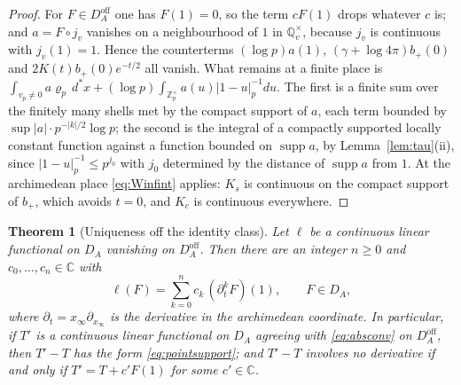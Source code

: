 \documentclass[11pt]{amsart}
\newtheorem{theorem}{Theorem}[section]
\theoremstyle{definition}
\theoremstyle{remark}
\newcommand{\C}{\mathbb C}
\newcommand{\Z}{\mathbb Z}
\newcommand{\Q}{\mathbb Q}
\newcommand{\dstar}{\,d^{*}}
\newcommand{\supp}{\operatorname{supp}}
\newcommand{\DA}{D_A}
\begin{document}
\begin{proof}
For $F\in\DA^{\mathrm{off}}$ one has $F(1)=0$, so the term $cF(1)$ drops
whatever $c$ is; and $a=F\circ j_v$ vanishes on a neighbourhood of $1$ in
$\Q_v^{\times}$, because $j_v$ is continuous with $j_v(1)=1$.  Hence the
counterterms $(\log p)a(1)$, $(\gamma+\log4\pi)b_{+}(0)$ and
$2K(t)b_{+}(0)e^{-t/2}$ all vanish.  What remains at a finite place is
$\int_{v_p\ne0}a\varrho_p\dstar x+(\log p)\int_{\Z_p^{\times}}a(u)|1-u|_p^{-1}du$.
The first is a finite sum over the finitely many shells met by the compact
support of $a$, each term bounded by $\sup|a|\cdot p^{-|k|/2}\log p$; the
second is the integral of a compactly supported locally constant function
against a function bounded on $\supp a$, by Lemma~\ref{lem:tau}(ii), since
$|1-u|_p^{-1}\le p^{j_0}$ with $j_0$ determined by the distance of $\supp a$
from $1$.  At the archimedean place \eqref{eq:Winfint} applies: $K_{s}$ is
continuous on the compact support of $b_{+}$, which avoids $t=0$, and $K_{c}$
is continuous everywhere.
\end{proof}

\begin{theorem}[Uniqueness off the identity class]\label{thm:unique}
Let $\ell$ be a continuous linear functional on $\DA$ vanishing on
$\DA^{\mathrm{off}}$.  Then there are an integer $n\ge0$ and
$c_0,\dots,c_n\in\C$ with
\begin{equation}\label{eq:pointsupport}
\ell(F)=\sum_{k=0}^{n}c_k\,(\partial_t^{k}F)(1),\qquad F\in\DA,
\end{equation}
where $\partial_t=x_{\infty}\partial_{x_{\infty}}$ is the derivative in the
archimedean coordinate.  In particular, if $T'$ is a continuous linear
functional on $\DA$ agreeing with \eqref{eq:absconv} on $\DA^{\mathrm{off}}$,
then $T'-T$ has the form \eqref{eq:pointsupport}; and $T'-T$ involves no
derivative if and only if $T'=T+c'F(1)$ for some $c'\in\C$.
\end{theorem}
\end{document}
